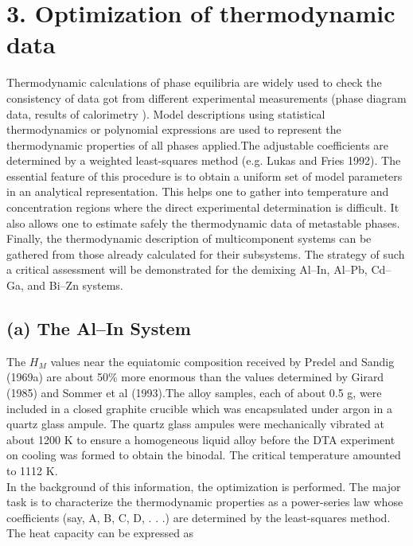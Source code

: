 \documentclass[12pt]{article}
\newcommand*{\1}{\hspace{1pt}}
\begin{document}
\begin{adjustbox}{center,caption={Calorimetrically determined slope of the enthalpy of mixing of liquid Cd–In alloy at
    628 K (after Predel and Oehme 1977). },label={somelabel},nofloat=figure,vspace=\bigskipamount}
\end{adjustbox}


\section*{3. Optimization of thermodynamic data}  

Thermodynamic calculations of phase equilibria are widely used to check the consistency
of data got from different experimental measurements (phase diagram data, results of
calorimetry ). Model descriptions using statistical
thermodynamics or polynomial expressions are used to represent the thermodynamic
properties of all phases applied.The adjustable coefficients are determined by a weighted
least-squares method (e.g. Lukas and Fries 1992). The essential feature of this procedure
is to obtain a uniform set of model parameters in an analytical representation. This helps
one to gather into temperature and concentration regions where the direct experimental
determination is difficult. It also allows one to estimate safely the thermodynamic data of
metastable phases. Finally, the thermodynamic description of multicomponent systems can
be gathered from those already calculated for their subsystems. The strategy of such a
critical assessment will be demonstrated for the demixing Al–In, Al–Pb, Cd–Ga, and Bi–Zn
systems. \\


\subsection*{(a) The Al–In System }

The $ H _M $ values near the equiatomic composition received by Predel and 
Sandig (1969a) are about 50\% more enormous than the values determined by 
Girard (1985) and Sommer et al (1993).The alloy samples, each of about 0.5 
g, were included in a closed graphite crucible which was encapsulated under 
argon in a quartz glass ampule. The quartz glass ampules were mechanically 
vibrated at about 1200 K to ensure a homogeneous liquid alloy before the DTA 
experiment on cooling was formed to obtain the binodal. The critical temperature 
amounted to 1112 K. \\
    In the background of this information, the optimization 
is performed. The major task is to characterize the thermodynamic properties 
as a power-series law whose coefficients
(say, A, B, C, D, . . .) are determined by the least-squares method. The 
heat capacity can be expressed as
\end{document}
